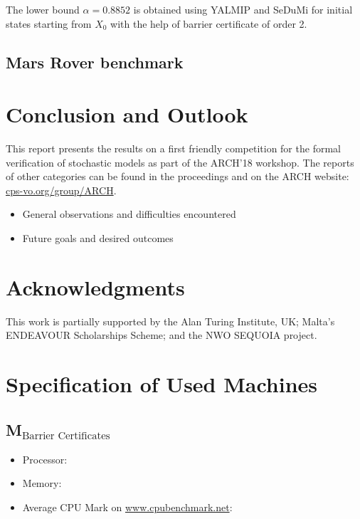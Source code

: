 \documentclass[EPiC]{easychair}
\newcommand{\todo}[1]{
  \begin{framed}
    \noindent{\bf TODO: }
    #1
  \end{framed}
}
\begin{document}
The lower bound $\alpha = 0.8852$ is obtained using YALMIP and SeDuMi for initial states starting from $X_0$ with the help of barrier certificate of order 2.
\newpage

\subsection{Mars Rover benchmark}
\section{Conclusion and Outlook}
\label{sect:conclusion}

This report presents the results on a first friendly competition for the formal verification of stochastic models as part of the ARCH'18 workshop. The reports of other categories can be found in the proceedings and on the ARCH website:  \href{http://cps-vo.org/group/ARCH}{cps-vo.org/group/ARCH}.  

\todo{
\begin{itemize}
\item General observations and difficulties encountered 
\item Future goals and desired outcomes
\end{itemize}
}

\section{Acknowledgments}
\label{sec:acks}

This work is partially supported by the Alan Turing Institute, UK; Malta's ENDEAVOUR Scholarships Scheme; and the NWO SEQUOIA project.

\appendix
\section{Specification of Used Machines} \label{sec:machines}

\subsection{M$_{\text{Barrier Certificates}}$} \label{sec:machine:bc}
\begin{itemize}
	\item Processor:  
    \item Memory: 
    \item Average CPU Mark on \url{www.cpubenchmark.net}: 
\end{itemize}
\end{document}
